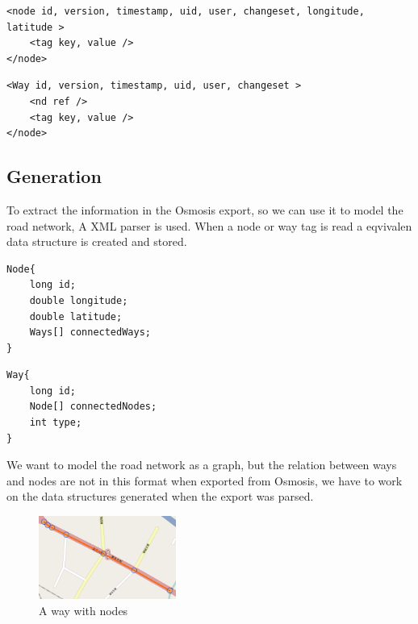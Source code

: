 \begin{lstlisting}[style=XML, caption=Node representation]
<node id, version, timestamp, uid, user, changeset, longitude, latitude >
	<tag key, value />
</node>
\end{lstlisting}

\begin{lstlisting}[style=XML, caption=Way representation]
<Way id, version, timestamp, uid, user, changeset >
	<nd ref />
	<tag key, value />
</node>
\end{lstlisting}

\subsection{Generation}
To extract the information in the Osmosis export, so we can use it to model the road network, A XML parser is used. When a node or way tag is read a eqvivalen data structure is created and stored. 
\begin{lstlisting}[style=java, caption=Datastructure for a node]
Node{
	long id;
	double longitude;
	double latitude;
	Ways[] connectedWays;
}
\end{lstlisting}

\begin{lstlisting}[style=java, caption=Datastructure for a way]
Way{
	long id;
	Node[] connectedNodes;
	int type;
}
\end{lstlisting}

We want to model the road network as a graph, but the relation between ways and nodes are not in this format when exported from Osmosis, we have to work on the data structures generated when the export was parsed.

\begin{figure}[h!]
  \centering
    \includegraphics[width=0.4\textwidth]{figures/way-w-nodes.png}
    \caption{A way with nodes}
    \label{fig:waywithnodes}
\end{figure}